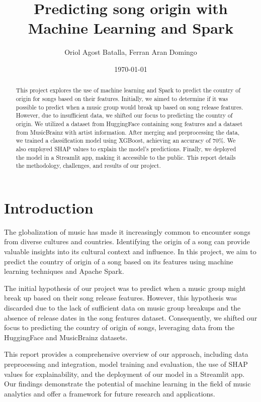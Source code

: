 \documentclass{article}
\begin{document}
\title{Predicting song origin with Machine Learning and Spark}
\author{Oriol Agost Batalla, Ferran Aran Domingo}
\date{\today}
\maketitle
\begin{abstract}
    This project explores the use of machine learning and Spark to predict the country of origin for songs based on their features. Initially, we aimed to determine if it was possible to predict when a music group would break up based on song release features. However, due to insufficient data, we shifted our focus to predicting the country of origin. We utilized a dataset from HuggingFace containing song features and a dataset from MusicBrainz with artist information. After merging and preprocessing the data, we trained a classification model using XGBoost, achieving an accuracy of 70\%. We also employed SHAP values to explain the model's predictions. Finally, we deployed the model in a Streamlit app, making it accessible to the public. This report details the methodology, challenges, and results of our project.
\end{abstract}

\section{Introduction}
The globalization of music has made it increasingly common to encounter songs from diverse cultures and countries. Identifying the origin of a song can provide valuable insights into its cultural context and influence. In this project, we aim to predict the country of origin of a song based on its features using machine learning techniques and Apache Spark.

The initial hypothesis of our project was to predict when a music group might break up based on their song release features. However, this hypothesis was discarded due to the lack of sufficient data on music group breakups and the absence of release dates in the song features dataset. Consequently, we shifted our focus to predicting the country of origin of songs, leveraging data from the HuggingFace and MusicBrainz datasets.

This report provides a comprehensive overview of our approach, including data preprocessing and integration, model training and evaluation, the use of SHAP values for explainability, and the deployment of our model in a Streamlit app. Our findings demonstrate the potential of machine learning in the field of music analytics and offer a framework for future research and applications.
\end{document}

